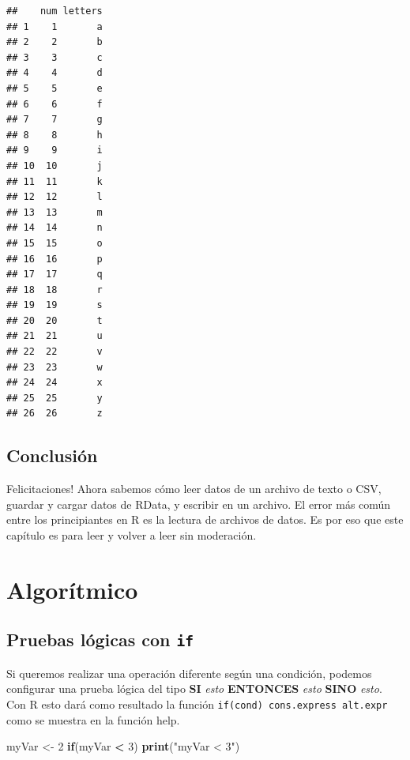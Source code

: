 \documentclass[
]{book}
\newenvironment{Shaded}{\begin{snugshade}}{\end{snugshade}}
\newcommand{\ControlFlowTok}[1]{\textcolor[rgb]{0.13,0.29,0.53}{\textbf{#1}}}
\newcommand{\DecValTok}[1]{\textcolor[rgb]{0.00,0.00,0.81}{#1}}
\newcommand{\KeywordTok}[1]{\textcolor[rgb]{0.13,0.29,0.53}{\textbf{#1}}}
\newcommand{\NormalTok}[1]{#1}
\newcommand{\OperatorTok}[1]{\textcolor[rgb]{0.81,0.36,0.00}{\textbf{#1}}}
\newcommand{\StringTok}[1]{\textcolor[rgb]{0.31,0.60,0.02}{#1}}
\begin{document}
\begin{verbatim}
##    num letters
## 1    1       a
## 2    2       b
## 3    3       c
## 4    4       d
## 5    5       e
## 6    6       f
## 7    7       g
## 8    8       h
## 9    9       i
## 10  10       j
## 11  11       k
## 12  12       l
## 13  13       m
## 14  14       n
## 15  15       o
## 16  16       p
## 17  17       q
## 18  18       r
## 19  19       s
## 20  20       t
## 21  21       u
## 22  22       v
## 23  23       w
## 24  24       x
## 25  25       y
## 26  26       z
\end{verbatim}

\hypertarget{conclusiuxf3n-5}{%
\section{Conclusión}\label{conclusiuxf3n-5}}

Felicitaciones! Ahora sabemos cómo leer datos de un archivo de texto o CSV, guardar y cargar datos de RData, y escribir en un archivo. El error más común entre los principiantes en R es la lectura de archivos de datos. Es por eso que este capítulo es para leer y volver a leer sin moderación.

\hypertarget{algo}{%
\chapter{Algorítmico}\label{algo}}

\hypertarget{l17if}{%
\section{\texorpdfstring{Pruebas lógicas con \texttt{if}}{Pruebas lógicas con if}}\label{l17if}}

Si queremos realizar una operación diferente según una condición, podemos configurar una prueba lógica del tipo \textbf{SI} \emph{esto} \textbf{ENTONCES} \emph{esto} \textbf{SINO} \emph{esto}. Con R esto dará como resultado la función \texttt{if(cond)\ cons.express\ alt.expr} como se muestra en la función help.

\begin{Shaded}
\begin{Highlighting}[]
\NormalTok{myVar <-}\StringTok{ }\DecValTok{2}
\ControlFlowTok{if}\NormalTok{(myVar }\OperatorTok{<}\StringTok{ }\DecValTok{3}\NormalTok{) }\KeywordTok{print}\NormalTok{(}\StringTok{"myVar < 3"}\NormalTok{)}
\end{Highlighting}
\end{Shaded}
\end{document}
